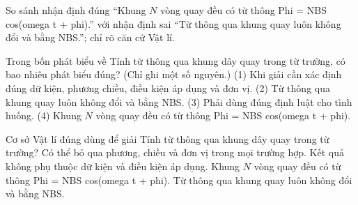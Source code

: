 \begin{bt}
So sánh nhận định đúng “Khung $N$ vòng quay đều có từ thông Phi = NBS cos(omega t + phi).” với nhận định sai “Từ thông qua khung quay luôn không đổi và bằng NBS.”; chỉ rõ căn cứ Vật lí.
\end{bt}

\begin{ex}
Trong bốn phát biểu về Tính từ thông qua khung dây quay trong từ trường, có bao nhiêu phát biểu đúng? (Chỉ ghi một số nguyên.) (1) Khi giải cần xác định đúng dữ kiện, phương chiều, điều kiện áp dụng và đơn vị. (2) Từ thông qua khung quay luôn không đổi và bằng NBS. (3) Phải dùng đúng định luật cho tình huống. (4) Khung $N$ vòng quay đều có từ thông Phi = NBS cos(omega t + phi).
\end{ex}

\begin{ex}
Cơ sở Vật lí đúng dùng để giải Tính từ thông qua khung dây quay trong từ trường?
\choice
{Có thể bỏ qua phương, chiều và đơn vị trong mọi trường hợp.}
{Kết quả không phụ thuộc dữ kiện và điều kiện áp dụng.}
{\True Khung $N$ vòng quay đều có từ thông Phi = NBS cos(omega t + phi).}
{Từ thông qua khung quay luôn không đổi và bằng NBS.}
\end{ex}

